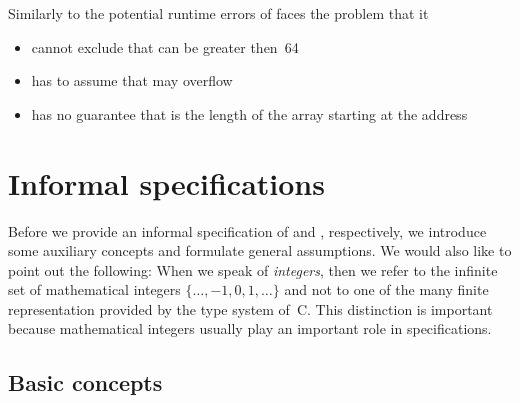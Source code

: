 Similarly to the potential runtime errors of \peek \framacwp
faces the problem that it

\begin{itemize}
\item cannot exclude that  can be greater then~64 
\item has to assume that  may overflow
\item has no guarantee that  is the length 
      of the array starting at the address 
\end{itemize}

\clearpage

\section{Informal specifications}
\label{sec:informal-specification}

Before we provide an informal specification of \peek and \poke, respectively,
we introduce some auxiliary concepts and formulate general assumptions.
We would also like to point out the following: 
When we speak of \emph{integers}, then we refer to the infinite set of mathematical
integers $\{\ldots, -1, 0, 1, \ldots\}$
and not to one of the many finite representation provided by the type system of~C.
This distinction is important because mathematical integers
usually play an important role in \acsl specifications.

\subsection{Basic concepts}

